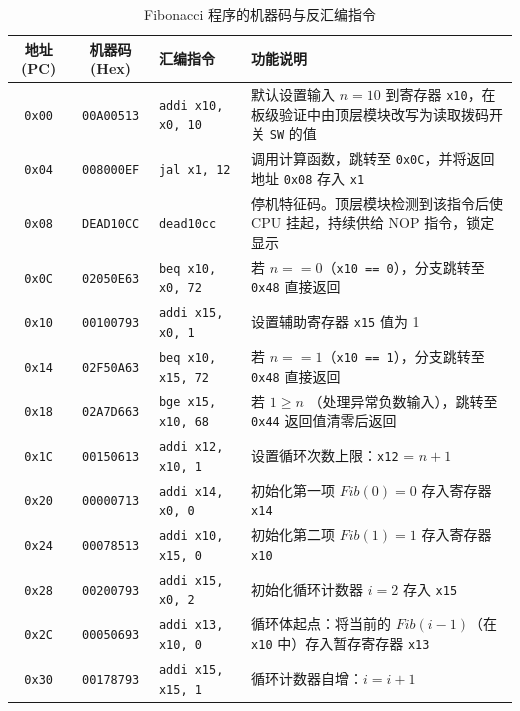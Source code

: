 \documentclass[12pt, a4paper]{ctexart}
\begin{document}
\begin{table}[htbp]
    \centering
    \small
    \caption{Fibonacci 程序的机器码与反汇编指令}
    \label{tab:fib_instructions}
    \begin{tabular}{cclp{6.0cm}}
        \toprule
        地址 (PC) & 机器码 (Hex) & 汇编指令 & 功能说明 \\
        \midrule
        \texttt{0x00} & \texttt{00A00513} & \texttt{addi x10, x0, 10} & 默认设置输入 $n=10$ 到寄存器 \texttt{x10}，在板级验证中由顶层模块改写为读取拨码开关 \texttt{SW} 的值 \\
        \texttt{0x04} & \texttt{008000EF} & \texttt{jal x1, 12} & 调用计算函数，跳转至 \texttt{0x0C}，并将返回地址 \texttt{0x08} 存入 \texttt{x1} \\
        \texttt{0x08} & \texttt{DEAD10CC} & \texttt{dead10cc} & 停机特征码。顶层模块检测到该指令后使 CPU 挂起，持续供给 NOP 指令，锁定显示 \\
        \texttt{0x0C} & \texttt{02050E63} & \texttt{beq x10, x0, 72} & 若 $n == 0$（\texttt{x10 == 0}），分支跳转至 \texttt{0x48} 直接返回 \\
        \texttt{0x10} & \texttt{00100793} & \texttt{addi x15, x0, 1} & 设置辅助寄存器 \texttt{x15} 值为 1 \\
        \texttt{0x14} & \texttt{02F50A63} & \texttt{beq x10, x15, 72} & 若 $n == 1$（\texttt{x10 == 1}），分支跳转至 \texttt{0x48} 直接返回 \\
        \texttt{0x18} & \texttt{02A7D663} & \texttt{bge x15, x10, 68} & 若 $1 \ge n$ （处理异常负数输入），跳转至 \texttt{0x44} 返回值清零后返回 \\
        \texttt{0x1C} & \texttt{00150613} & \texttt{addi x12, x10, 1} & 设置循环次数上限：\texttt{x12} = $n + 1$ \\
        \texttt{0x20} & \texttt{00000713} & \texttt{addi x14, x0, 0} & 初始化第一项 $Fib(0) = 0$ 存入寄存器 \texttt{x14} \\
        \texttt{0x24} & \texttt{00078513} & \texttt{addi x10, x15, 0} & 初始化第二项 $Fib(1) = 1$ 存入寄存器 \texttt{x10} \\
        \texttt{0x28} & \texttt{00200793} & \texttt{addi x15, x0, 2} & 初始化循环计数器 $i = 2$ 存入 \texttt{x15} \\
        \texttt{0x2C} & \texttt{00050693} & \texttt{addi x13, x10, 0} & 循环体起点：将当前的 $Fib(i-1)$（在 \texttt{x10} 中）存入暂存寄存器 \texttt{x13} \\
        \texttt{0x30} & \texttt{00178793} & \texttt{addi x15, x15, 1} & 循环计数器自增：$i = i + 1$ \\

\end{tabular}
\end{table}
\end{document}
